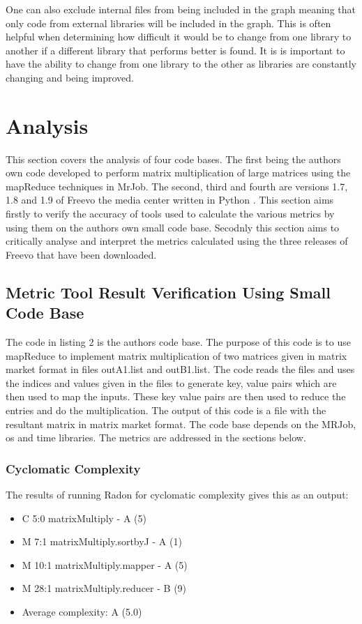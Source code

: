 \documentclass[11pt,journal, a4paper]{IEEEtran}
\begin{document}
\noindent
One can also exclude internal files from being included in the graph meaning that only code from external libraries will be included in the graph. This is often helpful when determining how difficult it would be to change from one library to another if a different library that performs better is found. It is is important to have the ability to change from one library to the other as libraries are constantly changing and being improved. 

\section{Analysis}
\noindent
This section covers the analysis of four code bases. The first being the authors own code developed to perform matrix multiplication of large matrices using the mapReduce techniques in MrJob. The second, third and fourth are versions 1.7, 1.8 and 1.9 of Freevo the media center written in Python \cite{Freevo}. This section aims firstly to verify the accuracy of tools used to calculate the various metrics by using them on the authors own small code base. Secodnly this section aims to critically analyse and interpret the metrics calculated using the three releases of Freevo that have been downloaded. 

\subsection{Metric Tool Result Verification Using Small Code Base}
\noindent
The code in listing 2 is the authors code base. The purpose of this code is to use mapReduce to implement matrix multiplication of two matrices given in matrix market format in files outA1.list and outB1.list. The code reads the files and uses the indices and values given in the files to generate key, value pairs which are then used to map the inputs. These key value pairs are then used to reduce the entries and do the multiplication. The output of this code is a file with the resultant matrix in matrix market format. The code base depends on the MRJob, os and time libraries. The metrics are addressed in the sections below. 

\subsubsection{Cyclomatic Complexity}
\noindent
The results of running Radon for cyclomatic complexity gives this as an output:
\begin{itemize}
\item C 5:0 matrixMultiply - A (5)
\item M 7:1 matrixMultiply.sortbyJ - A (1)
\item M 10:1 matrixMultiply.mapper - A (5)
\item M 28:1 matrixMultiply.reducer - B (9)
\item Average complexity: A (5.0)
\end{itemize}
\end{document}
